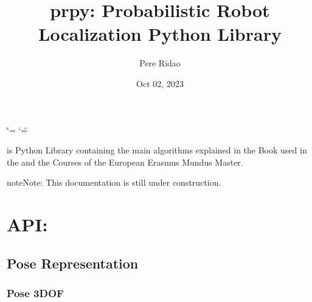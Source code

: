 \documentclass[letterpaper,10pt,english]{sphinxmanual}
\title{prpy: Probabilistic Robot Localization Python Library}
\date{Oct 02, 2023}
\author{Pere Ridao}
\begin{document}
\ifdefined\shorthandoff
  \ifnum\catcode`\=\string=\active\shorthandoff{=}\fi
  \ifnum\catcode`\"=\active{}\fi
\fi

\pagestyle{empty}
\sphinxmaketitle
\pagestyle{plain}
\sphinxtableofcontents
\pagestyle{normal}
\label{\detokenize{index::doc}}


\sphinxAtStartPar
{} is Python Library containing the main algorithms explained in the  Book used in the  and the  Courses of the  European Erasmus Mundus Master.

\begin{sphinxadmonition}{note}{Note:}
\sphinxAtStartPar
This documentation is still under construction.
\end{sphinxadmonition}


\chapter{API:}
\label{\detokenize{index:api}}
\sphinxstepscope


\section{Pose Representation}
\label{\detokenize{compounding:pose-representation}}\label{\detokenize{compounding::doc}}

\subsection{Pose 3DOF}
\label{\detokenize{compounding:pose-3dof}}
\begin{figure}[htbp]
\centering

\noindent{}
\end{figure}
\end{document}
